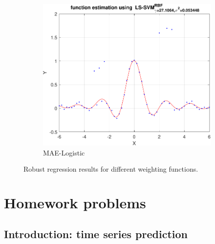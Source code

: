\documentclass{article}
\begin{document}
\begin{figure}[h]
\begin{subfigure}[b]{0.22\textwidth}
                 \label{fig:robust_regression_myriad}
             \end{subfigure}
             \hfill
             \begin{subfigure}[b]{0.22\textwidth}
                 \centering
                 \includegraphics[width=\textwidth]{Assignment 2/figures/1_4/robust_mae_wlogistic.pdf}
                 \caption{MAE-Logistic}
                 \label{fig:robust_regression_logistic}
             \end{subfigure}
            \caption{Robust regression results for different weighting functions.}
        \end{figure}
    
\section{Homework problems}
    \subsection{Introduction: time series prediction}
        
        
        
\end{document}
